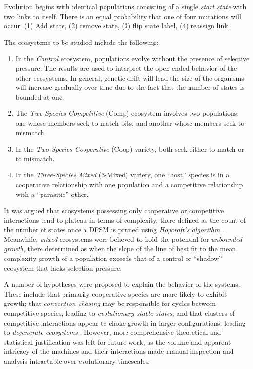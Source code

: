 \documentclass{article}
\begin{document}
Evolution begins with identical populations consisting of a single \textit{start state} with two 
links to itself. There is an equal probability that one of 
four mutations will occur: (1) Add state, (2) remove state, (3) flip state label, (4) reassign link.

The ecosystems to be studied include the following:
\begin{enumerate}
    \item In the \textit{Control} ecosystem, populations evolve without the presence of selective pressure.
        The results are used to interpret the open-ended behavior of the other ecosystems.
        In general, genetic drift will lead the size of the organisms will increase gradually 
        over time due to the fact that the number of states is bounded at one.
    \item The \textit{Two-Species Competitive} (Comp) ecosystem involves two populations: one 
        whose members seek to match bits, and another whose members seek to mismatch.
    \item In the \textit{Two-Species Cooperative} (Coop) variety, both seek either to match or 
        to mismatch. 
    \item In the \textit{Three-Species Mixed} (3-Mixed) variety, one ``host'' species is in a 
        cooperative relationship with one population and a competitive relationship with a ``parasitic'' other. 
\end{enumerate}

It was argued that ecosystems possessing only cooperative or competitive interactions tend to 
plateau in terms of complexity, there defined as the count of the number of states once a DFSM 
is pruned using \textit{Hopcroft's algorithm} \citep{Hopcroft1971AnNL}. Meanwhile, 
\textit{mixed} ecosystems were believed to hold the potential for \textit{unbounded growth}, 
there determined as when the slope of the line of best fit to the mean complexity growth of a 
population exceeds that of a control or ``shadow'' ecosystem that lacks selection pressure. 

A number of hypotheses were proposed to explain the behavior of the systems. These include that 
primarily cooperative species are more likely to exhibit growth; that \textit{convention chasing} 
may be responsible for cycles between competitive species, leading to 
\textit{evolutionary stable states}; and that clusters of competitive interactions appear to 
choke growth in larger configurations, leading to \textit{degenerate ecosystems} 
\citep{Ficici1998ChallengesIC,watson2001coevolutionary}. However, more comprehensive theoretical and statistical 
justification was left for future work, as the volume and apparent intricacy of the machines 
and their interactions made manual inspection and analysis intractable over evolutionary timescales. 
\end{document}
